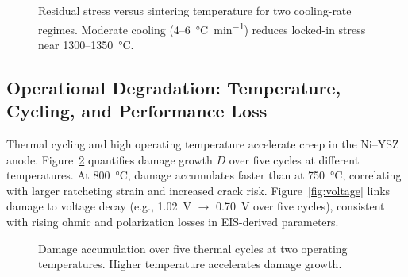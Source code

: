\documentclass[conference]{IEEEtran}
\begin{document}
\begin{figure}[t]
  \centering
  \caption{Residual stress versus sintering temperature for two cooling-rate regimes. Moderate cooling (\SI{4}{}–\SI{6}{\celsius\per\minute}) reduces locked-in stress near \SI{1300}{}–\SI{1350}{\celsius}.}
  \label{fig:residual}
  \vspace{-0.5em}
\end{figure}

\subsection{Operational Degradation: Temperature, Cycling, and Performance Loss}
Thermal cycling and high operating temperature accelerate creep in the Ni–YSZ anode. Figure~\ref{fig:creep} quantifies damage growth $D$ over five cycles at different temperatures. At \SI{800}{\celsius}, damage accumulates faster than at \SI{750}{\celsius}, correlating with larger ratcheting strain and increased crack risk. Figure~\ref{fig:voltage} links damage to voltage decay (e.g., \SI{1.02}{V} $\to$ \SI{0.70}{V} over five cycles), consistent with rising ohmic and polarization losses in EIS-derived parameters.

\begin{figure}[t]
  \centering
  \caption{Damage accumulation over five thermal cycles at two operating temperatures. Higher temperature accelerates damage growth.}
  \label{fig:creep}
  \vspace{-0.5em}
\end{figure}
\end{document}
